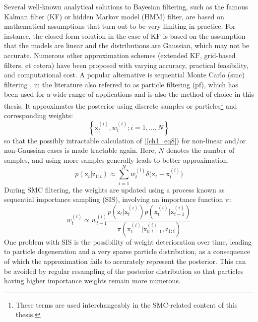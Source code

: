 Several well-known analytical solutions to Bayesian filtering, such as the famous Kalman filter (KF) or hidden Markov model (HMM) filter, are based on mathematical assumptions that turn out to be very limiting in practice. For instance, the closed-form solution in the case of KF is based on the assumption that the models are linear and the distributions are Gaussian, which may not be accurate. Numerous other approximation schemes (extended KF, grid-based filters, et cetera) have been proposed with varying accuracy, practical feasibility, and computational cost. A popular alternative is  sequential Monte Carlo (\gls{smc}) filtering \cite{arulampalam2002tutorial}, in the literature also referred to as particle filtering (\gls{pf}), which has been used for a wide range of applications and is also the method of choice in this thesis. It approximates the posterior using discrete samples or particles\footnote{These terms are used interchangeably in the SMC-related content of this thesis.} and corresponding weights:
\begin{equation}
\left\lbrace \mathrm{x}_{t}^{(i)}, w_{t}^{(i)}; i = 1, \dots , N \right\rbrace
\label{ch1_eq9}
\end{equation}
so that the possibly intractable calculation of (\ref{ch1_eq8}) for non-linear and/or non-Gaussian cases is made tractable again. Here, $N$ denotes the number of samples, and using more samples generally leads to better approximation:
\begin{equation}
p(\mathrm{x}_t | \mathrm{z}_{1:t}) \approx \sum_{i=1}^{N} w_{t}^{(i)}\delta\big(\mathrm{x}_{t} - \mathrm{x}_{t}^{(i)}\big)
\label{ch1_approx}
\end{equation}
During SMC filtering, the weights are updated using a process known as sequential importance sampling (SIS), involving an importance function $\pi$:
\begin{equation}
w_{t}^{(i)} \propto w_{t-1}^{(i)} \frac{p(\mathrm{z}_t | \mathrm{x}_{t}^{(i)}) p(\mathrm{x}_{t}^{(i)} | \mathrm{x}_{t-1}^{(i)} )}{ \pi(\mathrm{x}_{t}^{(i)} | \mathrm{x}_{0:t-1}^{(i)}, \mathrm{z}_{1:t}) }
\label{ch1_eq10}
\end{equation}
One problem with SIS is the possibility of weight deterioration over time, leading to particle degeneration and a very sparse particle distribution, as a consequence of which the approximation fails to accurately represent the posterior. This can be avoided by regular resampling of the posterior distribution so that particles having higher importance weights remain more numerous.

